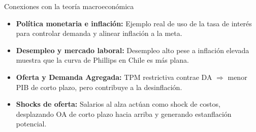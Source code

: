 \documentclass[11pt,addpoints]{article}
\begin{document}
\begin{frame}{Conexiones con la teoría macroeconómica}
\begin{itemize}
  \item \textbf{Política monetaria e inflación:} Ejemplo real de uso de la tasa de interés para controlar demanda y alinear inflación a la meta.  
  \item \textbf{Desempleo y mercado laboral:} Desempleo alto pese a inflación elevada muestra que la curva de Phillips en Chile es más plana.  
  \item \textbf{Oferta y Demanda Agregada:} TPM restrictiva contrae DA $\Rightarrow$ menor PIB de corto plazo, pero contribuye a la desinflación.  
  \item \textbf{Shocks de oferta:} Salarios al alza actúan como shock de costos, desplazando OA de corto plazo hacia arriba y generando estanflación potencial.  
\end{itemize}
\end{frame}
\end{document}
